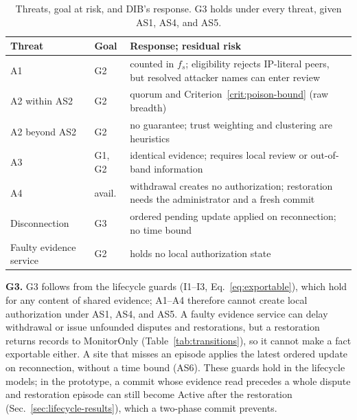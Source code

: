 \documentclass[journal]{IEEEtran}
\theoremstyle{definition}
\begin{document}
\begin{table}[t]
\centering
\caption{Threats, goal at risk, and DIB's response. G3 holds under every threat, given AS1, AS4, and AS5.}
\label{tab:threats}
\scriptsize
\begin{tabular}{@{}p{1.45cm}p{0.95cm}p{4.65cm}@{}}
\toprule
Threat & Goal & Response; residual risk \\
\midrule
A1 & G2 & counted in $f_s$; eligibility rejects IP-literal peers, but resolved attacker names can enter review \\
A2 within AS2 & G2 & quorum and Criterion~\ref{crit:poison-bound} (raw breadth) \\
A2 beyond AS2 & G2 & no guarantee; trust weighting and clustering are heuristics \\
A3 & G1, G2 & identical evidence; requires local review or out-of-band information \\
A4 & avail. & withdrawal creates no authorization; restoration needs the administrator and a fresh commit \\
Disconnection & G3 & ordered pending update applied on reconnection; no time bound \\
Faulty evidence service & G2 & holds no local authorization state \\
\bottomrule
\end{tabular}
\end{table}

\textbf{G3.} G3 follows from the lifecycle guards (I1--I3, Eq.~\ref{eq:exportable}), which hold for any content of shared evidence; A1--A4 therefore cannot create local authorization under AS1, AS4, and AS5. A faulty evidence service can delay withdrawal or issue unfounded disputes and restorations, but a restoration returns records to MonitorOnly (Table~\ref{tab:transitions}), so it cannot make a fact exportable either. A site that misses an episode applies the latest ordered update on reconnection, without a time bound (AS6). These guards hold in the lifecycle models; in the prototype, a commit whose evidence read precedes a whole dispute and restoration episode can still become Active after the restoration (Sec.~\ref{sec:lifecycle-results}), which a two-phase commit prevents.
\end{document}
